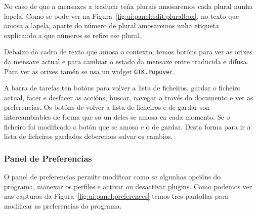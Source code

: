 No caso de que a mensaxes a traducir teña plurais amosaremos cada plural nunha lapela. Como se pode ver na Figura~\ref{fig:ui:panel:edit:pluralbox}, no texto que amosa a lapela, aparte do número de plural amosaremos unha etiqueta explicando a que números se refire ese plural.

Debaixo do cadro de texto que amosa o contexto, temos botóns para ver as orixes da mensaxe actual e para cambiar o estado da mensaxe entre traducida e difusa. Para ver as orixes tamén se usa un widget \lstinline{GTK.Popover}.

A barra de tarefas ten botóns para volver a lista de ficheiros, gardar o ficheiro actual, facer e desfacer as accións, buscar, navegar a través do documento e ver as preferencias. Os botóns de volver a lista de ficheiros e de gardar son intercambiables de forma que so un deles se amosa en cada momento. Se o ficheiro foi modificado o botón que se amosa e o de gardar. Desta forma para ir a lista de ficheiros gardados deberemos salvar os cambios.


\subsubsection{Panel de Preferencias}
O panel de preferencias permite modificar como se algunhas opcións do programa, manexar os perfiles e activar ou desactivar plugins. Como podemos ver nas capturas da Figura~\ref{fig:ui:panel:preferences} temos tres pantallas para modificar as preferencias do programa.

